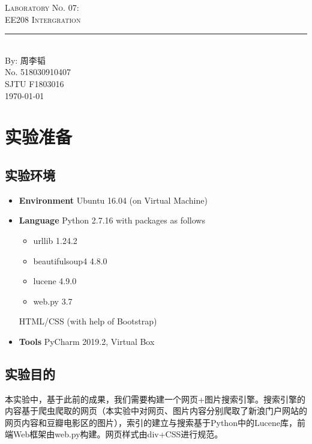\documentclass{article}
\newcommand{\labno}{07}
\newcommand{\labtitle}{EE208 Intergration}
\newcommand{\authorname}{周李韬}
\newcommand{\studentno}{518030910407}
\newcommand{\classno}{F1803016}
\begin{document}
\begin{center}
{\LARGE \textsc{Laboratory No. \labno:} \\ \vspace{4pt}}
{\Large \textsc{\labtitle} \\ \vspace{4pt}} 
\rule[13pt]{\textwidth}{1pt} \\ \vspace{15pt}
{\large By: \authorname \\ \vspace{10pt}
No. \studentno \\ \vspace{10pt}
SJTU \classno \\ \vspace{10pt}
\today \vspace{20pt}}
\end{center}



\section{实验准备}

\subsection{实验环境}
\begin{itemize}
\item\textbf{Environment} Ubuntu 16.04 (on Virtual Machine)
\item\textbf{Language} Python 2.7.16 with packages as follows
	\begin{itemize}
	\item urllib 1.24.2
	\item beautifulsoup4 4.8.0
	\item lucene 4.9.0
	\item web.py 3.7
	\end{itemize}
	HTML/CSS (with help of Bootstrap)
\item\textbf{Tools} PyCharm 2019.2, Virtual Box
\end{itemize}

\subsection{实验目的}

本实验中，基于此前的成果，我们需要构建一个网页+图片搜索引擎。搜索引擎的内容基于爬虫爬取的网页（本实验中对网页、图片内容分别爬取了新浪门户网站的网页内容和豆瓣电影区的图片），索引的建立与搜索基于Python中的Lucene库，前端Web框架由web.py构建。网页样式由div+CSS进行规范。
\end{document}
